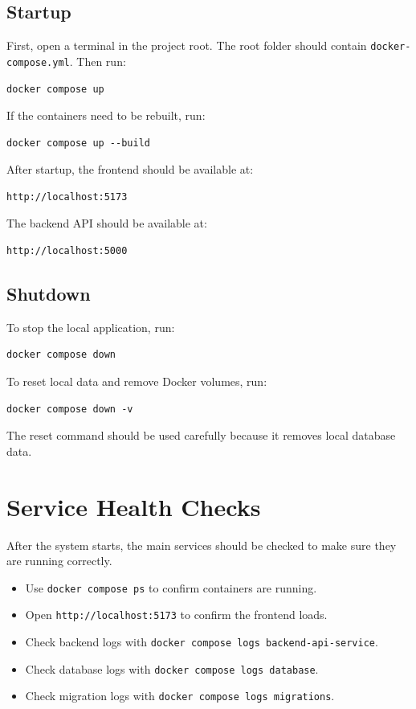 \documentclass{article}
\begin{document}
\subsection{Startup}
First, open a terminal in the project root. The root folder should contain \texttt{docker-compose.yml}. Then run:

\begin{verbatim}
docker compose up
\end{verbatim}

If the containers need to be rebuilt, run:

\begin{verbatim}
docker compose up --build
\end{verbatim}

After startup, the frontend should be available at:

\begin{verbatim}
http://localhost:5173
\end{verbatim}

The backend API should be available at:

\begin{verbatim}
http://localhost:5000
\end{verbatim}

\subsection{Shutdown}
To stop the local application, run:

\begin{verbatim}
docker compose down
\end{verbatim}

To reset local data and remove Docker volumes, run:

\begin{verbatim}
docker compose down -v
\end{verbatim}

The reset command should be used carefully because it removes local database data.

\section{Service Health Checks}
After the system starts, the main services should be checked to make sure they are running correctly.

\begin{itemize}
    \item Use \texttt{docker compose ps} to confirm containers are running.
    \item Open \texttt{http://localhost:5173} to confirm the frontend loads.
    \item Check backend logs with \texttt{docker compose logs backend-api-service}.
    \item Check database logs with \texttt{docker compose logs database}.
    \item Check migration logs with \texttt{docker compose logs migrations}.
\end{itemize}
\end{document}
